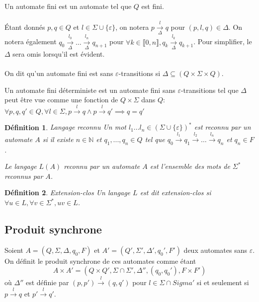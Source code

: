 \documentclass[10pt,a4paper]{article}
\newtheorem{mydef}{D\'efinition}
\newcommand{\enum}[2]{\llbracket #1, #2 \rrbracket}
\begin{document}
Un automate fini est un automate tel que $Q$ est fini.
\paragraph{}
\'Etant donn\'es $p,q \in Q$ et $l\in \Sigma \cup \{\varepsilon\}$, on notera $p \underset{\Delta}{\overset{l}{{\to}}}q$ pour $(p,l,q) \in \Delta$. On notera \'egalement $q_0 \underset{\Delta}{\overset{l_0}{{\to}}} \dots \underset{\Delta}{\overset{l_n}{{\to}}} q_{n+1}$ pour $\forall k \in \enum{0}{n}, q_k 
\underset{\Delta}{\overset{l_k}{{\to}}} q_{k+1}$. Pour simplifier, le $\Delta$ sera omis lorsqu'il est \'evident.
\paragraph{}
On dit qu'un automate fini est sans $\varepsilon$-transitions si $\Delta \subseteq (Q\times \Sigma \times Q)$.

Un automate fini d\'eterministe est un automate fini sans $\varepsilon$-transitions tel que $\Delta$ peut \^etre vue comme une fonction de $Q\times \Sigma$ dans $Q$: $\forall p,q,q' \in Q, \forall l \in \Sigma, p\overset{l}{{\to}}q \land p\overset{l}{{\to}}q' \implies q=q'$

\begin{mydef}{Langage reconnu}
Un mot $l_1...l_n \in \left(\Sigma\cup \{\varepsilon\}\right)^*$ est reconnu par un automate $A$ si il existe $n \in \mathbb N$ et $q_1,...,q_n \in Q$ tel que $q_0 \overset{l_1}{{\to}} q_1 \overset{l_2}{{\to}} \dots \overset{l_n}{{\to}} q_{n}$ et $q_{n} \in F$.

Le langage $L(A)$ reconnu par un automate $A$ est l'ensemble des mots de $\Sigma^*$ reconnus par $A$.
\end{mydef}
\begin{mydef}{Extension-clos}
Un langage $L$ est dit extension-clos si $\forall u \in L, \forall v \in \Sigma^*, uv \in L$.
\end{mydef}
\subsection{Produit synchrone}

Soient $A = (Q, \Sigma, \Delta, q_0, F)$ et $A' = (Q', \Sigma', \Delta', q_0', F')$ deux automates sans $\varepsilon$. On définit le produit synchrone de ces automates comme \'etant $$A\times A' = (Q \times Q', \Sigma \cap \Sigma', \Delta'', (q_0, q_0'), F\times F')$$ o\`u $\Delta''$ est d\'efinie par $(p,p')\overset{l}{{\to}}(q,q')$ pour $l\in \Sigma\cap Sigma'$ si et seulement si $p\overset{l}{{\to}}q$ et $p'\overset{l}{{\to}}q'$.
\end{document}
